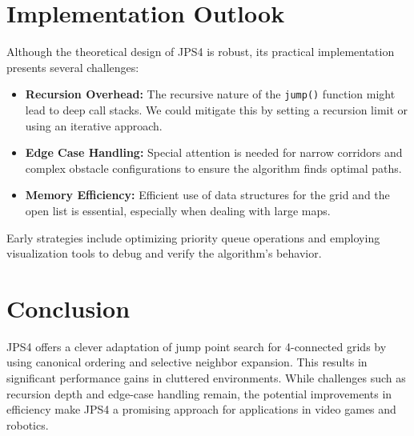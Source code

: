 \documentclass[11pt]{article}
\begin{document}
\section{Implementation Outlook}
Although the theoretical design of JPS4 is robust, its practical implementation presents several challenges:
\begin{itemize}
    \item \textbf{Recursion Overhead:} The recursive nature of the \texttt{jump()} function might lead to deep call stacks. We could mitigate this by setting a recursion limit or using an iterative approach.
    \item \textbf{Edge Case Handling:} Special attention is needed for narrow corridors and complex obstacle configurations to ensure the algorithm finds optimal paths.
    \item \textbf{Memory Efficiency:} Efficient use of data structures for the grid and the open list is essential, especially when dealing with large maps.
\end{itemize}
Early strategies include optimizing priority queue operations and employing visualization tools to debug and verify the algorithm’s behavior.

\section*{Conclusion}
JPS4 offers a clever adaptation of jump point search for 4-connected grids by using canonical ordering and selective neighbor expansion. This results in significant performance gains in cluttered environments. While challenges such as recursion depth and edge-case handling remain, the potential improvements in efficiency make JPS4 a promising approach for applications in video games and robotics.
\end{document}
